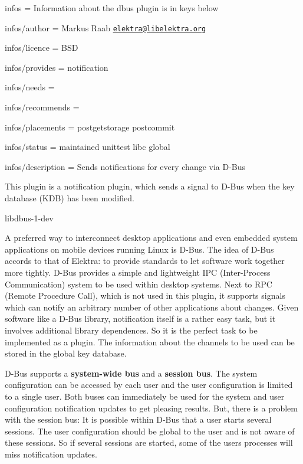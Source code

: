 
\begin{DoxyItemize}
\item infos = Information about the dbus plugin is in keys below
\item infos/author = Markus Raab \href{mailto:elektra@libelektra.org}{\tt elektra@libelektra.\+org}
\item infos/licence = B\+SD
\item infos/provides = notification
\item infos/needs =
\item infos/recommends =
\item infos/placements = postgetstorage postcommit
\item infos/status = maintained unittest libc global
\item infos/description = Sends notifications for every change via D-\/\+Bus
\end{DoxyItemize}

This plugin is a notification plugin, which sends a signal to D-\/\+Bus when the key database (K\+DB) has been modified.


\begin{DoxyItemize}
\item {\ttfamily libdbus-\/1-\/dev}
\end{DoxyItemize}

A preferred way to interconnect desktop applications and even embedded system applications on mobile devices running Linux is D-\/\+Bus. The idea of D-\/\+Bus accords to that of Elektra\+: to provide standards to let software work together more tightly. D-\/\+Bus provides a simple and lightweight I\+PC (Inter-\/\+Process Communication) system to be used within desktop systems. Next to R\+PC (Remote Procedure Call), which is not used in this plugin, it supports signals which can notify an arbitrary number of other applications about changes. Given software like a D-\/\+Bus library, notification itself is a rather easy task, but it involves additional library dependences. So it is the perfect task to be implemented as a plugin. The information about the channels to be used can be stored in the global key database.

D-\/\+Bus supports a {\bfseries system-\/wide bus} and a {\bfseries session bus}. The system configuration can be accessed by each user and the user configuration is limited to a single user. Both buses can immediately be used for the system and user configuration notification updates to get pleasing results. But, there is a problem with the session bus\+: It is possible within D-\/\+Bus that a user starts several sessions. The user configuration should be global to the user and is not aware of these sessions. So if several sessions are started, some of the user\textquotesingle{}s processes will miss notification updates.

